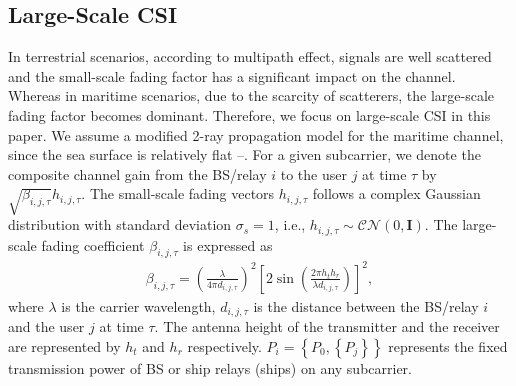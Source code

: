 \documentclass[conference]{IEEEtran}
\begin{document}
 \subsection{Large-Scale CSI}
 
 In terrestrial scenarios, according to multipath effect, signals are well scattered and the small-scale fading factor has a significant impact on the channel. Whereas in maritime scenarios, due to the scarcity of scatterers, the large-scale fading factor becomes dominant. Therefore, we focus on large-scale CSI in this paper.
 We assume a modified 2-ray propagation model for the maritime channel, since the sea surface is relatively flat \cite{p0}--\cite{p2}. For a given subcarrier, we denote the composite channel gain from the BS/relay $i$ to the user $j$ at time $\tau $ by $\sqrt {{\beta _{i,j,\tau }}} {h_{i,j,\tau }}$. The small-scale fading vectors ${h_{i,j,\tau }}$ follows a complex Gaussian distribution with standard deviation ${\sigma _s} = 1$, i.e., ${h_{i,j,\tau }} \sim \mathcal{CN}(0, \mathbf{I})$. The large-scale fading coefficient ${\beta _{i,j,\tau }}$ is expressed as
 \begin{align}
 {\beta _{i,j,\tau }} = {\left( {\frac{\lambda }{{4\pi {d_{i,j,\tau }}}}} \right)^2}{\left[ {2\sin \left( {\frac{{2\pi {h_t}{h_r}}}{{\lambda {d_{i,j,\tau }}}}} \right)} \right]^2} ,
 \end{align}
 where $\lambda $ is the carrier wavelength, ${d_{i,j,\tau }}$ is the distance between the BS/relay $i$ and the user $j$ at time $\tau $. The antenna height of the transmitter and the receiver are represented by $h_t$ and $h_r$ respectively. $P_i = \left\{ {P_0,\left\{ {P_j} \right\}} \right\}$ represents the fixed transmission power of BS or ship relays (ships) on any subcarrier. 
 
\end{document}
